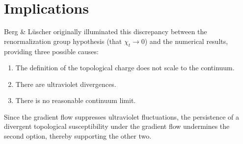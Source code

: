 \section{Implications}

Berg \& L\"uscher \cite{berg1981} originally illuminated this discrepancy between the renormalization group hypothesis (that $\chi_t \rightarrow 0$) and the numerical results, providing three possible causes: 
\begin{enumerate}
    \item The definition of the topological charge does not scale to the continuum.
    \item There are ultraviolet divergences.
    \item There is no reasonable continuum limit.
\end{enumerate}
Since the gradient flow suppresses ultraviolet fluctuations, the persistence of a divergent topological susceptibility under the gradient flow undermines the second option, thereby supporting the other two. 
